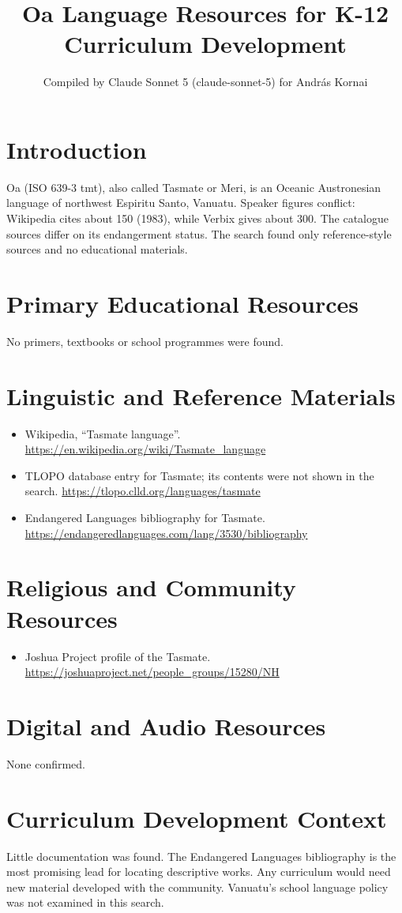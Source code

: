 \documentclass[12pt]{article}
\title{Oa Language Resources for K-12 Curriculum Development}
\author{Compiled by Claude Sonnet 5 (claude-sonnet-5) for Andr\'as Kornai}
\date{}
\begin{document}
\maketitle

\section{Introduction}
Oa (ISO 639-3 tmt), also called Tasmate or Meri, is an Oceanic Austronesian language of northwest Espiritu Santo, Vanuatu. Speaker figures conflict: Wikipedia cites about 150 (1983), while Verbix gives about 300. The catalogue sources differ on its endangerment status. The search found only reference-style sources and no educational materials.

\section{Primary Educational Resources}
No primers, textbooks or school programmes were found.

\section{Linguistic and Reference Materials}
\begin{itemize}
\item Wikipedia, ``Tasmate language''. \url{https://en.wikipedia.org/wiki/Tasmate_language}
\item TLOPO database entry for Tasmate; its contents were not shown in the search. \url{https://tlopo.clld.org/languages/tasmate}
\item Endangered Languages bibliography for Tasmate. \url{https://endangeredlanguages.com/lang/3530/bibliography}
\end{itemize}

\section{Religious and Community Resources}
\begin{itemize}
\item Joshua Project profile of the Tasmate. \url{https://joshuaproject.net/people_groups/15280/NH}
\end{itemize}

\section{Digital and Audio Resources}
None confirmed.

\section{Curriculum Development Context}
Little documentation was found. The Endangered Languages bibliography is the most promising lead for locating descriptive works. Any curriculum would need new material developed with the community. Vanuatu's school language policy was not examined in this search.
\end{document}
